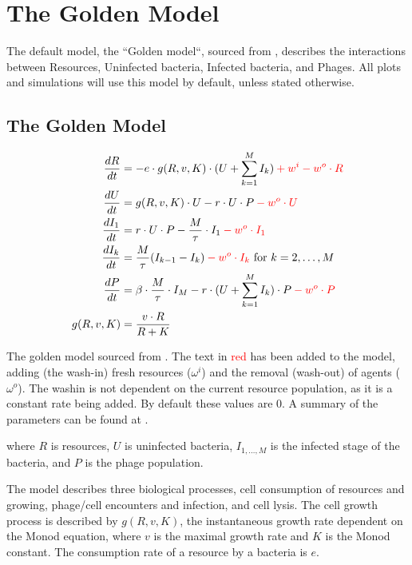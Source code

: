 \section{The Golden Model}
\label{sec:golden_model}
The default model, the “Golden model“, sourced from \citet{gengUsingBacterialPopulation2024}, describes the interactions between Resources, Uninfected bacteria, Infected bacteria, and Phages. 
All plots and simulations will use this model by default, unless stated otherwise. 

\subsection{The Golden Model}
\begin{eqfloat}
    \begin{align}
        \frac{dR}{dt} &= -e \cdot g(R, v, K)\cdot (U + \sum_{k=1}^{M} I_k) \mathcolor{red}{+ w^i -w^o \cdot R}\\
        \frac{dU}{dt} &= g(R, v, K)\cdot U - r\cdot U \cdot P \mathcolor{red}{-w^o \cdot U}\\
        \frac{dI_1}{dt} &= r\cdot U \cdot P - \frac{M}{\tau}\cdot I_1 \mathcolor{red}{-w^o \cdot I_1}\\
        \frac{dI_k}{dt} &= \frac{M}{\tau}(I_{k-1}-I_k) \mathcolor{red}{-w^o \cdot I_k}\text{ for } k=2, \dots, M \\
        \frac{dP}{dt} &= \beta \cdot\frac{M}{\tau} \cdot I_M - r\cdot(U + \sum_{k=1}^{M} I_k)\cdot P \mathcolor{red}{-w^o \cdot P} \\
        g(R, v, K) &= \frac{v\cdot R}{R + K}
        \label{eq:golden_model}
    \end{align}
    \caption{
        The golden model sourced from \citet{gengUsingBacterialPopulation2024}. 
        The text in \textcolor{red}{red} has been added to the model, adding (the wash-in) fresh resources ($\omega^i$) and the removal (wash-out) of agents ($\omega^o$). 
        The washin is not dependent on the current resource population, as it is a constant rate being added. 
        By default these values are 0.
        A summary of the parameters can be found at . 
    }
\end{eqfloat}

where $R$ is resources, $U$ is uninfected bacteria, $I_{1, \dots, M}$ is the infected stage of the bacteria, and $P$ is the phage population. 

The model describes three biological processes, cell consumption of resources and growing, phage/cell encounters and infection, and cell lysis. 
The cell growth process is described by $g(R, v, K)$, the instantaneous growth rate dependent on the Monod equation, where $v$ is the maximal growth rate and $K$ is the Monod constant. 
The consumption rate of a resource by a bacteria is $e$. 

